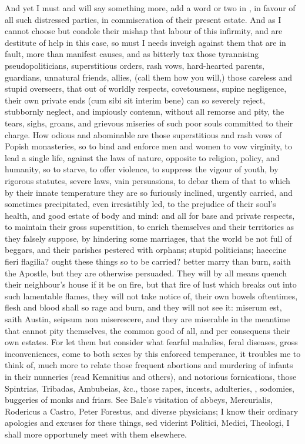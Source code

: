 {And yet I must and will say something more, add a word or two in
, in favour of all such distressed parties,
in commiseration of their present estate. And as I cannot choose but
condole their mishap that labour of this infirmity, and are destitute
of help in this case, so must I needs inveigh against them that are in
fault, more than manifest causes, and as bitterly tax those tyrannising
pseudopoliticians, superstitious orders, rash vows, hard-hearted
parents, guardians, unnatural friends, allies, (call them how you
will,) those careless and stupid overseers, that out of worldly
respects, covetousness, supine negligence, their own private ends (cum
sibi sit interim bene) can so severely reject, stubbornly neglect, and
impiously contemn, without all remorse and pity, the tears, sighs,
groans, and grievous miseries of such poor souls committed to their
charge. How odious and abominable are those superstitious and rash vows
of Popish monasteries, so to bind and enforce men and women to vow
virginity, to lead a single life, against the laws of nature, opposite
to religion, policy, and humanity, so to starve, to offer violence, to
suppress the vigour of youth, by rigorous statutes, severe laws, vain
persuasions, to debar them of that to which by their innate temperature
they are so furiously inclined, urgently carried, and sometimes
precipitated, even irresistibly led, to the prejudice of their soul's
health, and good estate of body and mind: and all for base and private
respects, to maintain their gross superstition, to enrich themselves
and their territories as they falsely suppose, by hindering some
marriages, that the world be not full of beggars, and their parishes
pestered with orphans; stupid politicians; haeccine fieri flagilia?
ought these things so to be carried? better marry than burn, saith the
Apostle, but they are otherwise persuaded. They will by all means
quench their neighbour's house if it be on fire, but that fire of lust
which breaks out into such lamentable flames, they will not take notice
of, their own bowels oftentimes, flesh and blood shall so rage and
burn, and they will not see it: miserum est, saith Austin, seipsum non
miserescere, and they are miserable in the meantime that cannot pity
themselves, the common good of all, and per consequens their own
estates. For let them but consider what fearful maladies, feral
diseases, gross inconveniences, come to both sexes by this enforced
temperance, it troubles me to think of, much more to relate those
frequent abortions and murdering of infants in their nunneries (read
Kemnitius and others), and notorious fornications, those
Spintrias, Tribadas, Ambubeias, \&c., those rapes, incests, adulteries,
, sodomies, buggeries of monks and friars. See Bale's
visitation of abbeys, Mercurialis, Rodericus a Castro, Peter
Forestus, and diverse physicians; I know their ordinary apologies and
excuses for these things, sed viderint Politici, Medici, Theologi, I
shall more opportunely meet with them elsewhere.


}
